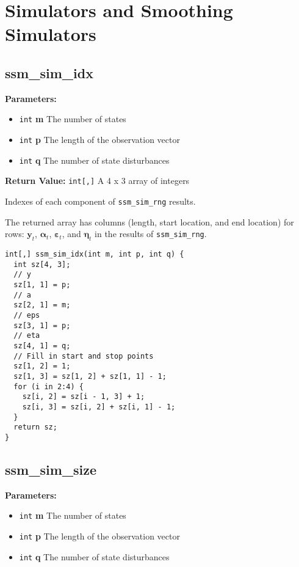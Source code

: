 \documentclass[]{book}
\providecommand{\tightlist}{%
  \setlength{\itemsep}{0pt}\setlength{\parskip}{0pt}}
\renewcommand{\vec}[1]{\boldsymbol{#1}}
\begin{document}
\section{Simulators and Smoothing
Simulators}\label{simulators-and-smoothing-simulators}

\subsection{ssm\_sim\_idx}\label{ssmux5fsimux5fidx}

\textbf{Parameters:}

\begin{itemize}
\tightlist
\item
  \texttt{int} \textbf{m} The number of states
\item
  \texttt{int} \textbf{p} The length of the observation vector
\item
  \texttt{int} \textbf{q} The number of state disturbances
\end{itemize}

\textbf{Return Value:} \texttt{int{[},{]}} A 4 x 3 array of integers

Indexes of each component of \texttt{ssm\_sim\_rng} results.

The returned array has columns (length, start location, and end
location) for rows: \(\vec{y}_t\), \(\vec{\alpha}_t\),
\(\vec{\varepsilon}_t\), and \(\vec{\eta}_t\) in the results of
\texttt{ssm\_sim\_rng}.

\begin{verbatim}
int[,] ssm_sim_idx(int m, int p, int q) {
  int sz[4, 3];
  // y
  sz[1, 1] = p;
  // a
  sz[2, 1] = m;
  // eps
  sz[3, 1] = p;
  // eta
  sz[4, 1] = q;
  // Fill in start and stop points
  sz[1, 2] = 1;
  sz[1, 3] = sz[1, 2] + sz[1, 1] - 1;
  for (i in 2:4) {
    sz[i, 2] = sz[i - 1, 3] + 1;
    sz[i, 3] = sz[i, 2] + sz[i, 1] - 1;
  }
  return sz;
}
\end{verbatim}

\subsection{ssm\_sim\_size}\label{ssmux5fsimux5fsize}

\textbf{Parameters:}

\begin{itemize}
\tightlist
\item
  \texttt{int} \textbf{m} The number of states
\item
  \texttt{int} \textbf{p} The length of the observation vector
\item
  \texttt{int} \textbf{q} The number of state disturbances
\end{itemize}
\end{document}

